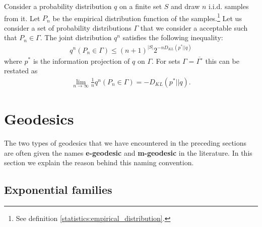     \begin{theorem}[Sanov]
        Consider a probability distribution $q$ on a finite set $S$ and draw $n$ i.i.d. samples from it. Let $P_n$ be the empirical distribution function of the samples.\footnote{See definition \ref{statistics:empirical_distribution}.} Let us consider a set of probability distributions $\Gamma$ that we consider a acceptable such that $P_n\in\Gamma$. The joint distribution $q^n$ satisfies the following inequality:
        \begin{gather}
            q^n(P_n\in\Gamma) \leq (n+1)^{|S|}2^{-n D_{KL}(p^*||q)}
        \end{gather}
        where $p^*$ is the information projection of $q$ on $\Gamma$. For sets $\Gamma=\overline{\Gamma^\circ}$ this can be restated as
        \begin{gather}
            \lim_{n\rightarrow\infty}\frac{1}{n}q^n(P_n\in\Gamma) = - D_{KL}(p^*||q).
        \end{gather}
    \end{theorem}

\section{Geodesics}

    The two types of geodesics that we have encountered in the preceding sections are often given the names \textbf{e-geodesic} and \textbf{m-geodesic} in the literature. In this section we explain the reason behind this naming convention.

\subsection{Exponential families}

